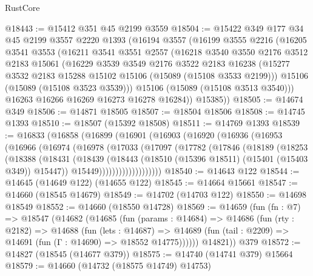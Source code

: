 \begin{lexlean}{RustCore}
\begin{coremodule}
@18443 := @15412 @351 @45 @2199 @3559
@18504 := @15422
    @349
    @177
    @34
    @45
    @2199
    @3557
    @2220
    @1393
    (@16194
      @3557
      (@16199
        @3555
        @2216
        (@16205
          @3541
          @3553
          (@16211
            @3541
            @3551
            @2557
            (@16218
              @3540
              @3550
              @2176
              @3512
              @2183
              @15061
              (@16229
                @3539
                @3549
                @2176
                @3522
                @2183
                @16238
                (@15277 @3532 @2183 @15288 @15102 @15106 (@15089 (@15108 @3533 @2199)))
                @15106
                (@15089 (@15108 @3523 @3539)))
              @15106
              (@15089 (@15108 @3513 @3540)))
            @16263
            @16266
            @16269
            @16273
            @16278
            @16284))
        @15385))
@18505 := @14674 @349
@18506 := @14871 @18505
@18507 := @18504 @18506
@18508 := @14745 @1393
@18510 := @18507 (@15392 @18508)
@18511 := @14769 @1393
@18539 := @16833
    (@16858
      (@16899
        (@16901
          (@16903
            (@16920
              (@16936
                (@16953
                  (@16966
                    (@16974
                      (@16978
                        (@17033
                          (@17097
                            (@17782
                              (@17846
                                (@18189
                                  (@18253
                                    (@18388
                                      (@18431
                                        (@18439
                                          (@18443
                                            (@18510 (@15396 @18511) (@15401 (@15403 @349)) @15447))
                                          @15449)))))))))))))))))))
@18540 := @14643 @122
@18544 := @14645 (@14649 @122) (@14655 @122)
@18545 := @14664 @15661
@18547 := @14660 (@18545 @14679)
@18549 := @14702 (@14703 @122)
@18550 := @14698 @18549
@18552 := @14660 (@18550 @14728)
@18569 := @14659
    (fun (fn : @7) =>
    @18547
      (@14682
        (@14685
          (fun (params : @14684) =>
          @14686
            (fun (rty : @2182) =>
            @14688
              (fun (lets : @14687) =>
              @14689 (fun (tail : @2209) => @14691 (fun (Γ : @14690) => @18552 @14775))))))
        @14821))
    @379
@18572 := @14827 (@18545 (@14677 @379))
@18575 := @14740 (@14741 @379) @15664
@18579 := @14660 (@14732 (@18575 @14749) @14753)

\end{coremodule}
\end{lexlean}
